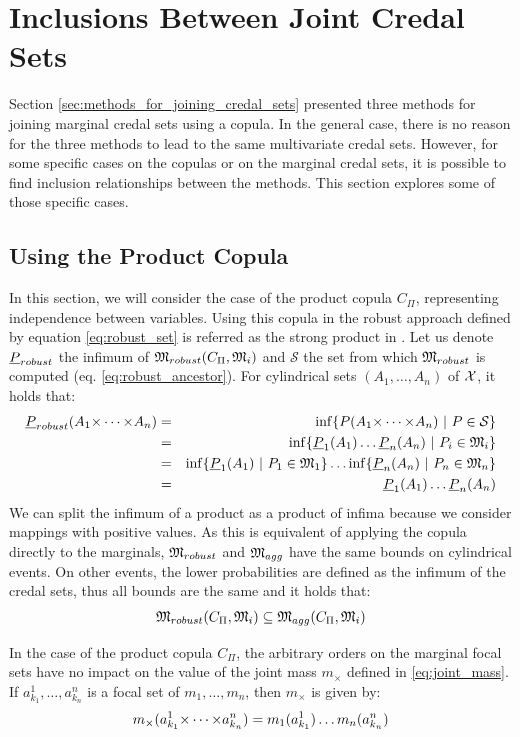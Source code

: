 \section{Inclusions Between Joint Credal Sets}\label{sec:inclusions_between_methods}
Section \ref{sec:methods_for_joining_credal_sets} presented three methods for joining marginal credal sets using a copula. In the general case, there is no reason for the three methods to lead to the same multivariate credal sets. However, for some specific cases on the copulas or on the marginal credal sets, it is possible to find inclusion relationships between the methods. This section explores some of those specific cases. 

\subsection{Using the Product Copula}\label{subsection:product_copula}
In this section, we will consider the case of the product copula $C_\Pi$, representing independence between variables. Using this copula in the robust approach defined by equation \eqref{eq:robust_set} is referred as the strong product in \cite{kacprzyk_factorisation_2010}. Let us denote ${\underline{P}}_{robust}$ the infimum of ${\mathfrak{M}}_{robust}(C_\Pi, {\mathfrak{M}}_i)$ and $\mathcal{S}$ the set from which ${\mathfrak{M}}_{robust}$ is computed (eq. \eqref{eq:robust_ancestor}).
For cylindrical sets $(A_1, \dots, A_n)$ of ${\mathcal{X}}$, it holds that:
\begin{eqnarray*}
    {\underline{P}}_{robust}(A_1{\times\dots\times} A_n) &=& \inf\{P(A_1{\times\dots\times} A_n)~|~P\in\mathcal{S}\}\\
    &=&\inf\{{\underline{P}}_1(A_1)\dots{\underline{P}}_n(A_n)~|~P_i\in{\mathfrak{M}}_i\}\\
    &=&\inf\{{\underline{P}}_1(A_1)~|~P_1\in{\mathfrak{M}}_1\}\dots\inf\{{\underline{P}}_n(A_n)~|~P_n\in{\mathfrak{M}}_n\}\\
    &=&{\underline{P}}_1(A_1)\dots{\underline{P}}_n(A_n)
\end{eqnarray*}
We can split the infimum of a product as a product of infima because we consider mappings with positive values. As this is equivalent of applying the copula directly to the marginals, ${\mathfrak{M}}_{robust}$ and ${\mathfrak{M}}_{agg}$ have the same bounds on cylindrical events. On other events, the lower probabilities are defined as the infimum of the credal sets, thus all bounds are the same and it holds that:
\begin{eqnarray}
    {\mathfrak{M}}_{robust}(C_\Pi, {\mathfrak{M}}_i)\subseteq{\mathfrak{M}}_{agg}(C_\Pi, {\mathfrak{M}}_i)
\end{eqnarray}

In the case of the product copula $C_\Pi$, the arbitrary orders on the marginal focal sets have no impact on the value of the joint mass $m_\times$ defined in \eqref{eq:joint_mass}. If $a^1_{k_1},\dots,a^n_{k_n}$ is a focal set of $m_1,\dots,m_n$, then $m_\times$ is given by:
\begin{eqnarray}\label{eq:joint_mass_product}
    m_\times(a^1_{k_1}{\times\dots\times} a^n_{k_n}) = m_1(a^1_{k_1})\dots m_n(a^n_{k_n})
\end{eqnarray}

